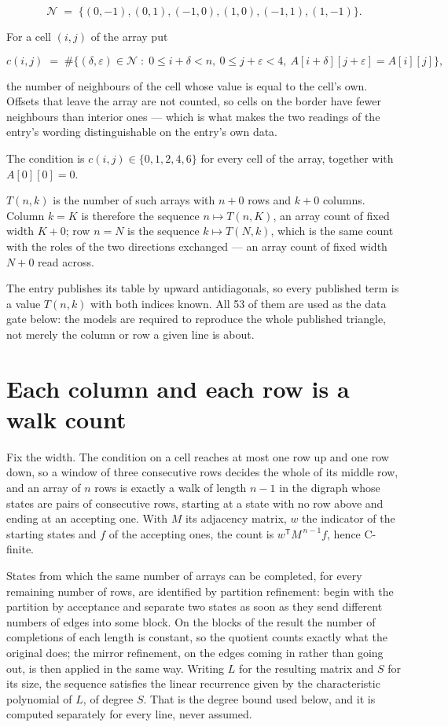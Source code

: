 \documentclass[11pt]{article}
\theoremstyle{definition}
\begin{document}
\[\mathcal{N} \;=\; \{(0,-1), (0,1), (-1,0), (1,0), (-1,1), (1,-1)\}.\]

For a cell $(i,j)$ of the array put

\[c(i,j) \;=\; \#\bigl\{(\delta,\varepsilon)\in\mathcal{N} \;:\; 0\le i+\delta<n,\ 0\le j+\varepsilon<4,\ A[i+\delta][j+\varepsilon] = A[i][j]\bigr\},\]

the number of neighbours of the cell whose value is equal to the cell's own. Offsets that leave the array are not counted, so cells on the border have fewer neighbours than interior ones --- which is what makes the two readings of the entry's wording distinguishable on the entry's own data.

The condition is $c(i,j) \in \{0, 1, 2, 4, 6\}$ for every cell of the array, together with $A[0][0]=0$.

$T(n,k)$ is the number of such arrays with $n + 0$ rows and $k + 0$ columns. Column $k = K$ is therefore the sequence $n \mapsto T(n,K)$, an array count of fixed width $K + 0$; row $n = N$ is the sequence $k \mapsto T(N,k)$, which is the same count with the roles of the two directions exchanged --- an array count of fixed width $N + 0$ read across.

The entry publishes its table by upward antidiagonals, so every published term is a value $T(n,k)$ with both indices known. All 53 of them are used as the data gate below: the models are required to reproduce the whole published triangle, not merely the column or row a given line is about.

\section{Each column and each row is a walk count}

Fix the width. The condition on a cell reaches at most one row up and one row down, so a window of three consecutive rows decides the whole of its middle row, and an array of $n$ rows is exactly a walk of length $n-1$ in the digraph whose states are pairs of consecutive rows, starting at a state with no row above and ending at an accepting one. With $M$ its adjacency matrix, $w$ the indicator of the starting states and $f$ of the accepting ones, the count is $w^{\mathsf T}M^{\,n-1}f$, hence C-finite.

States from which the same number of arrays can be completed, for every remaining number of rows, are identified by partition refinement: begin with the partition by acceptance and separate two states as soon as they send different numbers of edges into some block. On the blocks of the result the number of completions of each length is constant, so the quotient counts exactly what the original does; the mirror refinement, on the edges coming in rather than going out, is then applied in the same way. Writing $L$ for the resulting matrix and $S$ for its size, the sequence satisfies the linear recurrence given by the characteristic polynomial of $L$, of degree $S$. That is the degree bound used below, and it is computed separately for every line, never assumed.
\end{document}
